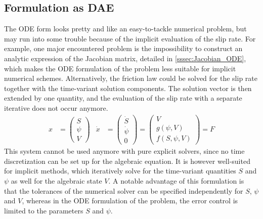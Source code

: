 \documentclass{report}
\begin{document}
\subsection{Formulation as DAE}
The ODE form looks pretty and like an easy-to-tackle numerical problem, but may run into some trouble because of the implicit evaluation of the slip rate. For example, one major encountered problem is the impossibility to construct an analytic expression of the Jacobian matrix, detailed in \autoref{sssec:Jacobian_ODE}, which makes the ODE formulation of the problem less suitable for implicit numerical schemes. Alternatively, the friction law could be solved for the slip rate together with the time-variant solution components. The solution vector is then extended by one quantity, and the evaluation of the slip rate with a separate iterative does not occur anymore.
\begin{align}
	\label{eq:DAE_formulation_SEAS}
	x &= \begin{pmatrix}
			S \\ \psi \\ V
		 \end{pmatrix} & \dot{x} &= \begin{pmatrix}
										\dot{S} \\ \dot{\psi} \\ 0
									\end{pmatrix} = \begin{pmatrix}
										V \\ g(\psi, V) \\ f(S,\psi,V)
									\end{pmatrix} = F
\end{align}
This system cannot be used anymore with pure explicit solvers, since no time discretization can be set up for the algebraic equation. It is however well-suited for implicit methods, which iteratively solve for the time-variant quantities $S$ and $\psi$ as well for the algebraic state $V$. A notable advantage of this formulation is that the tolerances of the numerical solver can be specified independently for $S$, $\psi$ and $V$, whereas in the ODE formulation of the problem, the error control is limited to the parameters $S$ and $\psi$. 
\end{document}
